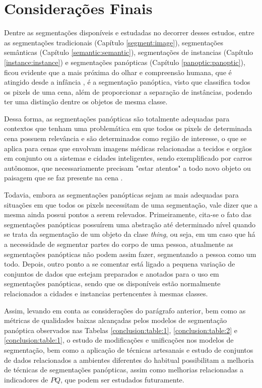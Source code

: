 \newpage
\clearpage
\section{Considerações Finais}
\label{final:final}

Dentre as segmentações disponíveis e estudadas no decorrer desses estudos, entre as segmentações tradicionais (Capítulo \ref{segment:image}), segmentações semânticas (Capítulo \ref{semantic:semantic}), segmentações de instancias (Capítulo \ref{instance:instance}) e segmentações panópticas (Capítulo \ref{panoptic:panoptic}), ficou evidente que a mais próxima do olhar e compreensão humana, que é atingido desde a infância \cite{Mohan2020}, é a segmentação panóptica, visto que classifica todos os pixels de uma cena, além de proporcionar a separação de instâncias, podendo ter uma distinção dentre os objetos de mesma classe.

Dessa forma, as segmentações panópticas são totalmente adequadas para contextos que tenham uma problemática em que todos os pixels de determinada cena possuem relevância e são determinados como região de interesse, o que se aplica para cenas que envolvam imagens médicas relacionadas a tecidos e orgãos em conjunto ou a sistemas e cidades inteligentes, sendo exemplificado por carros autônomos, que necessariamente precisam "estar atentos" a todo novo objeto ou paisagem que se faz presente na cena \cite{Pan2020}.

Todavia, embora as segmentações panópticas sejam as mais adequadas para situações em que todos os pixels necessitam de uma segmentação, vale dizer que a mesma ainda possui pontos a serem relevados. Primeiramente, cita-se o fato das segmentações panópticas possuírem uma abstração até determinado nível quando se trata da segmentação de um objeto da clase \textit{thing}, ou seja, em um caso que há a necessidade de segmentar partes do corpo de uma pessoa, atualmente as segmentações panópticas não podem assim fazer, segmentando a pessoa como um todo. Depois, outro ponto a se comentar está ligado a pequena variação de conjuntos de dados que estejam preparados e anotados para o uso em segmentações panópticas, sendo que os disponíveis estão normalmente relacionados a cidades e instancias pertencentes à mesmas classes.

Assim, levando em conta as considerações do parágrafo anterior, bem como as métricas de qualidades baixas alcançadas pelos modelos de segmentação panóptica observados nas Tabelas \ref{conclusion:table:1}, \ref{conclusion:table:2} e \ref{conclusion:table:1}, o estudo de modificações e unificações nos modelos de segmentação, bem como a aplicação de técnicas artesanais e estudo de conjuntos de dados relacionados a ambientes diferentes do habitual possibilitam a melhoria de técnicas de segmentações panópticas, assim como melhorias relacionadas a indicadores de $PQ$, que podem ser estudados futuramente.


